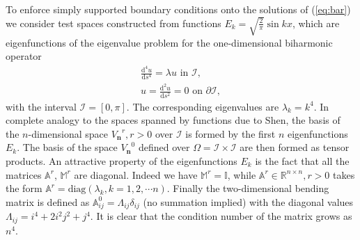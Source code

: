 \documentclass{marine_2015}
\newcommand{\Vh}{\ensuremath{V_{\mathbf{n}}}}
\newcommand{\deriv}[2]{\ensuremath{\frac{\mathrm{d}#1}{\mathrm{d}#2}}}
\begin{document}
To enforce simply supported boundary conditions onto the solutions of (\ref{eq:bar}) 
we consider test spaces constructed from functions $E_k=\sqrt{\tfrac{2}{\pi}}\sin{kx}$,
which are eigenfunctions of the eigenvalue problem for the one-dimensional biharmonic 
operator
\[
  \begin{aligned}
  \deriv{^4 u}{s^4} = \lambda u\text{ in }\mathcal{I},\\
  u = \deriv{^2 u}{s^2} = 0\text{ on }\partial\mathcal{I},
  \end{aligned}
\]
with the interval $\mathcal{I}=\left[0, \pi\right]$. The corresponding
eigenvalues are $\lambda_k=k^4$. In complete analogy to the spaces spanned by
functions due to Shen, the basis of the $n$-dimensional space $\Vh^r, r>0$ over
$\mathcal{I}$ is formed by the first $n$ eigenfunctions $E_k$. The basis of the
space $\Vh^0$ defined over $\Omega=\mathcal{I}\times\mathcal{I}$ are then formed
as tensor products. An attractive property of the eigenfunctions $E_k$ is the fact
that all the matrices $\mathbb{A}^r$, $\mathbb{M}^r$ are diagonal. Indeed we
have $\mathbb{M}^r=\mathbb{I}$, while $\mathbb{A}^r\in\mathbb{R}^{n \times n},
r>0$ takes the form $\mathbb{A}^r=\text{diag}\left(\lambda_k, k=1, 2, \cdots
n\right)$. Finally the two-dimensional bending matrix is defined as $\mathbb{A}^0_{ij}=
\Lambda_{ij}\delta_{ij}$ (no summation implied) with the diagonal values $\Lambda_{ij}= i^4 + 2 i^2 j^2 + j^4$.
It is clear that the condition number of the matrix grows as $n^4$. 
\end{document}
